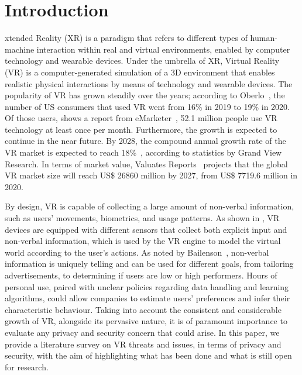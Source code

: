 \documentclass[journal]{IEEEtran}
\begin{document}
\section{Introduction}
% 
% 
% 
% 
xtended Reality (XR) is a paradigm that refers to different types of human-machine interaction within real and virtual environments, enabled by computer technology and wearable devices. Under the umbrella of XR, Virtual Reality (VR) is a computer-generated simulation of a 3D environment that enables realistic physical interactions by means of technology and wearable devices. The popularity of VR has grown steadily over the years; according to Oberlo~\cite{oberlo}, the number of US consumers that used VR went from 16\% in 2019 to 19\% in 2020. Of those users, shows a report from eMarketer~\cite{emarketer}, 52.1 million people use VR technology at least once per month. Furthermore, the growth is expected to continue in the near future. By 2028, the compound annual growth rate of the VR market is expected to reach 18\%~\cite{grandview}, according to statistics by Grand View Research. In terms of market value, Valuates Reports~\cite{valuatesVR} projects that the global VR market size will reach US\$ 26860 million by 2027, from US\$ 7719.6 million in 2020.

By design, VR is capable of collecting a large amount of non-verbal information, such as users' movements, biometrics, and usage patterns. As shown in , VR devices are equipped with different sensors that collect both explicit input and non-verbal information, which is used by the VR engine to model the virtual world according to the user's actions. As noted by Bailenson~\cite{bailenson2018}, non-verbal information is uniquely telling and can be used for different goals, from tailoring advertisements, to determining if users are low or high performers. Hours of personal use, paired with unclear policies regarding data handling and learning algorithms, could allow companies to estimate users' preferences and infer their characteristic behaviour.
Taking into account the consistent and considerable growth of VR, alongside its pervasive nature, it is of paramount importance to evaluate any privacy and security concern that could arise. In this paper, we provide a literature survey on VR threats and issues, in terms of privacy and security, with the aim of highlighting what has been done and what is still open for research.
\end{document}
